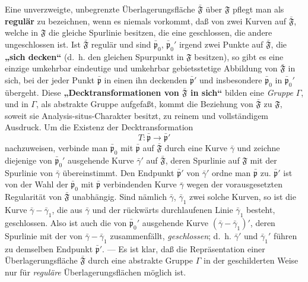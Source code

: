 \documentclass{article}
\begin{document}
Eine unverzweigte, unbegrenzte Überlagerungsfläche $\bar{\mathfrak{F}}$ über $\mathfrak{F}$ pflegt man als \textbf{regulär} zu bezeichnen, wenn es niemals vorkommt, daß von zwei Kurven auf $\bar{\mathfrak{F}}$, welche in $\mathfrak{F}$ die gleiche Spurlinie besitzen, die eine geschlossen, die andere ungeschlossen ist. Ist $\bar{\mathfrak{F}}$ regulär und sind $\bar{\mathfrak{p}}_0$, $\bar{\mathfrak{p}}_0'$ irgend zwei Punkte auf $\bar{\mathfrak{F}}$, die \textbf{„sich decken“} (d.~h. den gleichen Spurpunkt in $\mathfrak{F}$ besitzen), so gibt es eine einzige umkehrbar eindeutige und umkehrbar gebietsstetige Abbildung von $\bar{\mathfrak{F}}$ in sich, bei der jeder Punkt $\bar{\mathfrak{p}}$ in einen ihn deckenden $\bar{\mathfrak{p}}'$ und insbesondere $\bar{\mathfrak{p}}_0$ in $\bar{\mathfrak{p}}_0'$ übergeht. Diese \textbf{„Decktransformationen von $\bar{\mathfrak{F}}$ in sich“} bilden eine \emph{Gruppe} $\varGamma$, und in $\varGamma$, als abstrakte Gruppe aufgefaßt, kommt die Beziehung von $\bar{\mathfrak{F}}$ zu $\mathfrak{F}$, soweit sie Analysis-situs-Charakter besitzt, zu reinem und vollständigem Ausdruck. Um die Existenz der Decktransformation
\[ T\colon \bar{\mathfrak{p}} \to \bar{\mathfrak{p}}' \]
nachzuweisen, verbinde man $\bar{\mathfrak{p}}_0$ mit $\bar{\mathfrak{p}}$ auf $\bar{\mathfrak{F}}$ durch eine Kurve $\bar{\gamma}$ und zeichne diejenige von $\bar{\mathfrak{p}}_0'$ ausgehende Kurve $\bar{\gamma}'$ auf $\bar{\mathfrak{F}}$, deren Spurlinie auf $\mathfrak{F}$ mit der Spurlinie von $\bar{\gamma}$ übereinstimmt. Den Endpunkt $\bar{\mathfrak{p}}'$ von $\bar{\gamma}'$ ordne man $\bar{\mathfrak{p}}$ zu. $\bar{\mathfrak{p}}'$ ist von der Wahl der $\bar{\mathfrak{p}}_0$ mit $\bar{\mathfrak{p}}$ verbindenden Kurve $\bar{\gamma}$ wegen der vorausgesetzten Regularität von $\bar{\mathfrak{F}}$ unabhängig. Sind nämlich $\bar{\gamma}$, $\bar{\gamma}_1$ zwei solche Kurven, so ist die Kurve $\bar{\gamma} - \bar{\gamma}_1$, die aus $\bar{\gamma}$ und der rückwärts durchlaufenen Linie $\bar{\gamma}_1$ besteht, geschlossen. Also ist auch die von $\bar{\mathfrak{p}}_0'$ ausgehende Kurve $(\bar{\gamma} - \bar{\gamma}_1)'$, deren Spurlinie mit der von $\bar{\gamma} - \bar{\gamma}_1$ zusammenfällt, \emph{geschlossen}; d.~h. $\bar{\gamma}'$ und $\bar{\gamma}_1'$ führen zu demselben Endpunkt $\bar{\mathfrak{p}}'$. --- Es ist klar, daß die Repräsentation einer Überlagerungsfläche $\bar{\mathfrak{F}}$ durch eine abstrakte Gruppe $\varGamma$ in der geschilderten Weise nur für \emph{reguläre} Überlagerungsflächen möglich ist.
\end{document}
